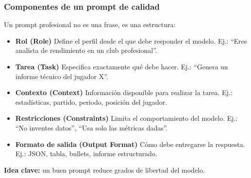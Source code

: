 \documentclass[aspectratio=169]{beamer}
\begin{document}
\begin{frame}
\frametitle{Componentes de un prompt de calidad}

Un prompt profesional no es una frase, es una estructura:

\vspace{0.4em}

\begin{itemize}
    \item \textbf{Rol (Role)}  
    Define el perfil desde el que debe responder el modelo.  
    Ej.: “Eres analista de rendimiento en un club profesional”.

    \vspace{0.3em}

    \item \textbf{Tarea (Task)}  
    Especifica exactamente qué debe hacer.  
    Ej.: “Genera un informe técnico del jugador X”.

    \vspace{0.3em}

    \item \textbf{Contexto (Context)}  
    Información disponible para realizar la tarea.  
    Ej.: estadísticas, partido, periodo, posición del jugador.

    \vspace{0.3em}

    \item \textbf{Restricciones (Constraints)}  
    Limita el comportamiento del modelo.  
    Ej.: “No inventes datos”, “Usa solo las métricas dadas”.

    \vspace{0.3em}

    \item \textbf{Formato de salida (Output Format)}  
    Cómo debe entregarse la respuesta.  
    Ej.: JSON, tabla, bullets, informe estructurado.
\end{itemize}

\vspace{0.4em}
\textbf{Idea clave:} un buen prompt reduce grados de libertad del modelo.
\end{frame}
\end{document}
